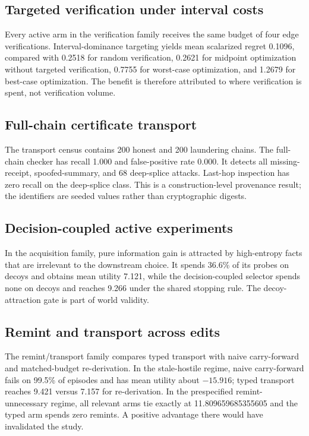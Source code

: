 \subsection{Targeted verification under interval costs}
Every active arm in the verification family receives the same budget of four edge verifications. Interval-dominance targeting yields mean scalarized regret 0.1096, compared with 0.2518 for random verification, 0.2621 for midpoint optimization without targeted verification, 0.7755 for worst-case optimization, and 1.2679 for best-case optimization. The benefit is therefore attributed to where verification is spent, not verification volume.

\subsection{Full-chain certificate transport}
The transport census contains 200 honest and 200 laundering chains. The full-chain checker has recall 1.000 and false-positive rate 0.000. It detects all missing-receipt, spoofed-summary, and 68 deep-splice attacks. Last-hop inspection has zero recall on the deep-splice class. This is a construction-level provenance result; the identifiers are seeded values rather than cryptographic digests.

\subsection{Decision-coupled active experiments}
In the acquisition family, pure information gain is attracted by high-entropy facts that are irrelevant to the downstream choice. It spends 36.6\% of its probes on decoys and obtains mean utility 7.121, while the decision-coupled selector spends none on decoys and reaches 9.266 under the shared stopping rule. The decoy-attraction gate is part of world validity.

\subsection{Remint and transport across edits}
The remint/transport family compares typed transport with naive carry-forward and matched-budget re-derivation. In the stale-hostile regime, naive carry-forward fails on 99.5\% of episodes and has mean utility about $-15.916$; typed transport reaches 9.421 versus 7.157 for re-derivation. In the prespecified remint-unnecessary regime, all relevant arms tie exactly at 11.809659685355605 and the typed arm spends zero remints. A positive advantage there would have invalidated the study.

